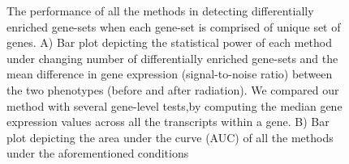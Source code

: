 \documentclass[hidelinks,11pt]{article}
\begin{document}
\begin{figure}[!ht]
\hfill
{}
\hfill
{}
\hfill
\caption{The performance of all the methods in detecting differentially enriched gene-sets when each gene-set is comprised of unique set of genes. A) Bar plot depicting the statistical power of each method under changing number of differentially enriched gene-sets and the mean difference in gene expression (signal-to-noise ratio) between the two phenotypes (before and after radiation). We compared our method with several gene-level tests,by computing the median gene expression values across all the transcripts within a gene. B) Bar plot depicting the area under the curve (AUC) of all the methods under the aforementioned conditions}
\end{figure}
\end{document}
